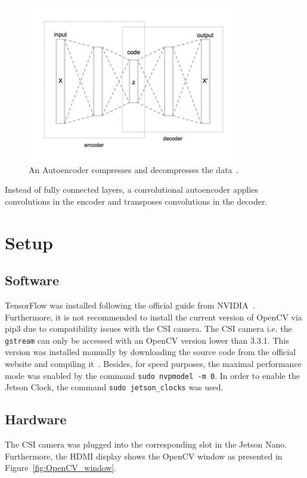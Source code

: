 \documentclass[a4paper,12pt, listof=totoc,toc=sectionentrywithdots]{scrartcl}
\begin{document}
\begin{figure}[h]
\centering
        \includegraphics[totalheight=5cm]{Figures/Autoencoder.png}
    \caption{An Autoencoder compresses and decompresses the data~\cite{autoencoderImg}.}
    \label{fig:autoencoder}
\end{figure}

Instead of fully connected layers, a convolutional autoencoder applies convolutions in the encoder and transposes convolutions in the decoder.

\section{Setup}

\subsection{Software}
TensorFlow was installed following the official guide from NVIDIA~\cite{jetsonNanoTensorFlow}.
Furthermore, it is not recommended to install the current version of OpenCV via pip3 due to compatibility issues with the CSI camera.
The CSI camera i.e. the \texttt{gstream} can only be accessed with an OpenCV version lower than 3.3.1.
This version was installed manually by downloading the source code from the official website and compiling it~\cite{opencv}.
Besides, for speed purposes, the maximal performance mode was enabled by the command \texttt{sudo nvpmodel -m 0}.
In order to enable the Jetson Clock, the command \texttt{sudo jetson\_clocks} was used.


\subsection{Hardware}
The CSI camera was plugged into the corresponding slot in the Jetson Nano.
Furthermore, the HDMI display shows the OpenCV window as presented in Figure~\ref{fig:OpenCV_window}.
\end{document}
